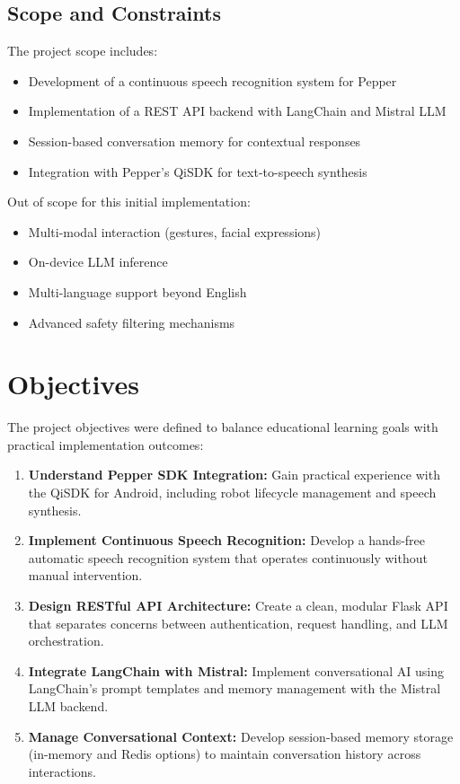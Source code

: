 \documentclass[a4paper]{article}
\begin{document}
\subsection{Scope and Constraints}

The project scope includes:
\begin{itemize}[noitemsep]
    \item Development of a continuous speech recognition system for Pepper
    \item Implementation of a REST API backend with LangChain and Mistral LLM
    \item Session-based conversation memory for contextual responses
    \item Integration with Pepper's QiSDK for text-to-speech synthesis
\end{itemize}

Out of scope for this initial implementation:
\begin{itemize}[noitemsep]
    \item Multi-modal interaction (gestures, facial expressions)
    \item On-device LLM inference
    \item Multi-language support beyond English
    \item Advanced safety filtering mechanisms
\end{itemize}

\section{Objectives}
The project objectives were defined to balance educational learning goals with practical implementation outcomes:

\begin{enumerate}[noitemsep]
    \item \textbf{Understand Pepper SDK Integration:} Gain practical experience with the QiSDK for Android, including robot lifecycle management and speech synthesis.
    
    \item \textbf{Implement Continuous Speech Recognition:} Develop a hands-free automatic speech recognition system that operates continuously without manual intervention.
    
    \item \textbf{Design RESTful API Architecture:} Create a clean, modular Flask API that separates concerns between authentication, request handling, and LLM orchestration.
    
    \item \textbf{Integrate LangChain with Mistral:} Implement conversational AI using LangChain's prompt templates and memory management with the Mistral LLM backend.
    
    \item \textbf{Manage Conversational Context:} Develop session-based memory storage (in-memory and Redis options) to maintain conversation history across interactions.
\end{enumerate}
\end{document}
